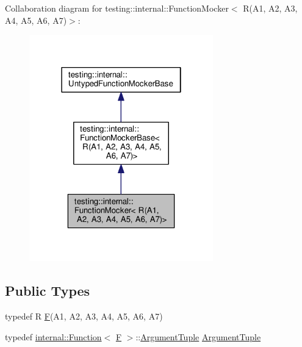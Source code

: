 Collaboration diagram for testing\+:\+:internal\+:\+:Function\+Mocker$<$ R(A1, A2, A3, A4, A5, A6, A7)$>$\+:
\nopagebreak
\begin{figure}[H]
\begin{center}
\leavevmode
\includegraphics[width=226pt]{classtesting_1_1internal_1_1_function_mocker_3_01_r_07_a1_00_01_a2_00_01_a3_00_01_a4_00_01_a5_00fe189f2cfc9654b435b5d92469ab8c0d}
\end{center}
\end{figure}
\subsection*{Public Types}
\begin{DoxyCompactItemize}
\item 
typedef R \hyperlink{classtesting_1_1internal_1_1_function_mocker_3_01_r_07_a1_00_01_a2_00_01_a3_00_01_a4_00_01_a5_00_01_a6_00_01_a7_08_4_a2ea0e33d9cc0d1f57d58b4aee98c117c}{F}(A1, A2, A3, A4, A5, A6, A7)
\item 
typedef \hyperlink{structtesting_1_1internal_1_1_function}{internal\+::\+Function}$<$ \hyperlink{classtesting_1_1internal_1_1_function_mocker_3_01_r_07_a1_00_01_a2_00_01_a3_00_01_a4_00_01_a5_00_01_a6_00_01_a7_08_4_a2ea0e33d9cc0d1f57d58b4aee98c117c}{F} $>$\+::\hyperlink{classtesting_1_1internal_1_1_function_mocker_3_01_r_07_a1_00_01_a2_00_01_a3_00_01_a4_00_01_a5_00_01_a6_00_01_a7_08_4_a313911b9c80b57c8c25f0ad5ef2d0bdc}{Argument\+Tuple} \hyperlink{classtesting_1_1internal_1_1_function_mocker_3_01_r_07_a1_00_01_a2_00_01_a3_00_01_a4_00_01_a5_00_01_a6_00_01_a7_08_4_a313911b9c80b57c8c25f0ad5ef2d0bdc}{Argument\+Tuple}
\end{DoxyCompactItemize}
